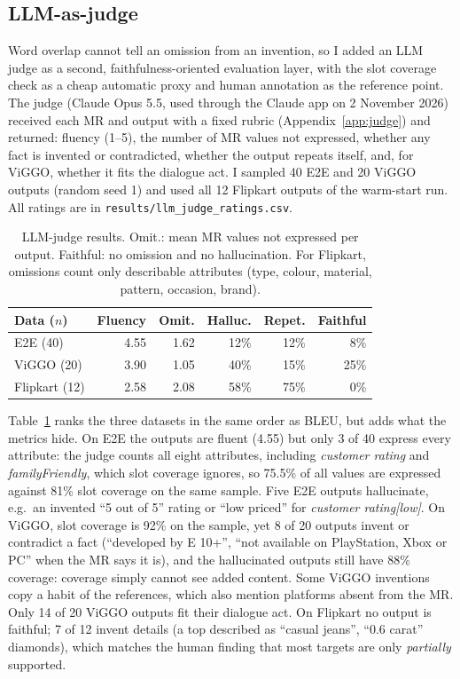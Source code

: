 \documentclass[11pt]{article}
\begin{document}
\subsection{LLM-as-judge}
Word overlap cannot tell an omission from an invention, so I added an LLM judge as a second, faithfulness-oriented evaluation layer, with the slot coverage check as a cheap automatic proxy and human annotation as the reference point. The judge (Claude Opus 5.5, used through the Claude app on 2 November 2026) received each MR and output with a fixed rubric (Appendix~\ref{app:judge}) and returned: fluency (1--5), the number of MR values not expressed, whether any fact is invented or contradicted, whether the output repeats itself, and, for ViGGO, whether it fits the dialogue act. I sampled 40 E2E and 20 ViGGO outputs (random seed 1) and used all 12 Flipkart outputs of the warm-start run. All ratings are in \texttt{results/llm\_judge\_ratings.csv}.

\begin{table}[t]
\centering\small
\setlength{\tabcolsep}{3.5pt}
\begin{tabular}{@{}lrrrrr@{}}
\toprule
Data ($n$) & Fluency & Omit. & Halluc. & Repet. & Faithful \\
\midrule
E2E (40) & 4.55 & 1.62 & 12\% & 12\% & 8\% \\
ViGGO (20) & 3.90 & 1.05 & 40\% & 15\% & 25\% \\
Flipkart (12) & 2.58 & 2.08 & 58\% & 75\% & 0\% \\
\bottomrule
\end{tabular}
\caption{LLM-judge results. Omit.: mean MR values not expressed per output. Faithful: no omission and no hallucination. For Flipkart, omissions count only describable attributes (type, colour, material, pattern, occasion, brand).}
\label{tab:judge}
\end{table}

Table~\ref{tab:judge} ranks the three datasets in the same order as BLEU, but adds what the metrics hide. On E2E the outputs are fluent (4.55) but only 3 of 40 express every attribute: the judge counts all eight attributes, including \textit{customer rating} and \textit{familyFriendly}, which slot coverage ignores, so 75.5\% of all values are expressed against 81\% slot coverage on the same sample. Five E2E outputs hallucinate, e.g.\ an invented ``5 out of 5'' rating or ``low priced'' for \textit{customer rating[low]}. On ViGGO, slot coverage is 92\% on the sample, yet 8 of 20 outputs invent or contradict a fact (``developed by E 10+'', ``not available on PlayStation, Xbox or PC'' when the MR says it is), and the hallucinated outputs still have 88\% coverage: coverage simply cannot see added content. Some ViGGO inventions copy a habit of the references, which also mention platforms absent from the MR. Only 14 of 20 ViGGO outputs fit their dialogue act. On Flipkart no output is faithful; 7 of 12 invent details (a top described as ``casual jeans'', ``0.6 carat'' diamonds), which matches the human finding that most targets are only \emph{partially} supported.
\end{document}
